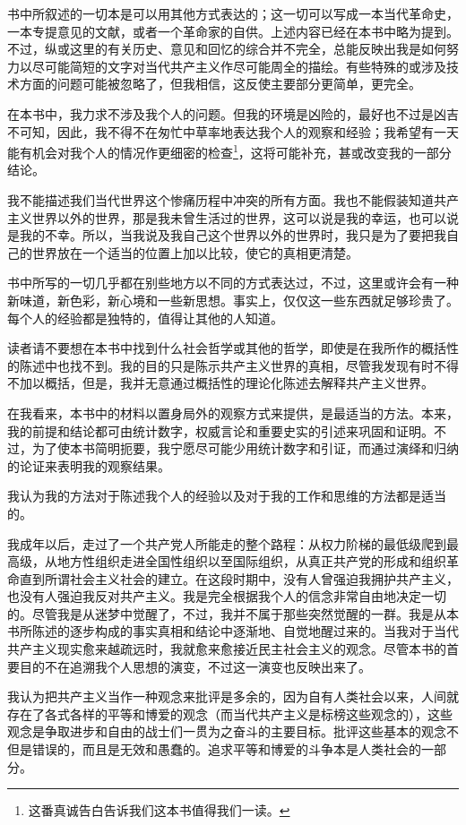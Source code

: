 \documentclass[12pt,oneside]{book}
\begin{document}
\begin{common-format}
书中所叙述的一切本是可以用其他方式表达的；这一切可以写成一本当代革命史，一本专提意见的文献，或者一个革命家的自供。上述内容已经在本书中略为提到。不过，纵或这里的有关历史、意见和回忆的综合并不完全，总能反映出我是如何努力以尽可能简短的文字对当代共产主义作尽可能周全的描绘。有些特殊的或涉及技术方面的问题可能被忽略了，但我相信，这反使主要部分更简单，更完全。
    
在本书中，我力求不涉及我个人的问题。但我的环境是凶险的，最好也不过是凶吉不可知，因此，我不得不在匆忙中草率地表达我个人的观察和经验；我希望有一天能有机会对我个人的情况作更细密的检查\footnote{这番真诚告白告诉我们这本书值得我们一读。}，这将可能补充，甚或改变我的一部分结论。

我不能描述我们当代世界这个惨痛历程中冲突的所有方面。我也不能假装知道共产主义世界以外的世界，那是我未曾生活过的世界，这可以说是我的幸运，也可以说是我的不幸。所以，当我说及我自己这个世界以外的世界时，我只是为了要把我自己的世界放在一个适当的位置上加以比较，使它的真相更清楚。

书中所写的一切几乎都在别些地方以不同的方式表达过，不过，这里或许会有一种新味道，新色彩，新心境和一些新思想。事实上，仅仅这一些东西就足够珍贵了。每个人的经验都是独特的，值得让其他的人知道。

读者请不要想在本书中找到什么社会哲学或其他的哲学，即使是在我所作的概括性的陈述中也找不到。我的目的只是陈示共产主义世界的真相，尽管我发现有时不得不加以概括，但是，我并无意通过概括性的理论化陈述去解释共产主义世界。

在我看来，本书中的材料以置身局外的观察方式来提供，是最适当的方法。本来，我的前提和结论都可由统计数字，权威言论和重要史实的引述来巩固和证明。不过，为了使本书简明扼要，我宁愿尽可能少用统计数字和引证，而通过演绎和归纳的论证来表明我的观察结果。

我认为我的方法对于陈述我个人的经验以及对于我的工作和思维的方法都是适当的。

我成年以后，走过了一个共产党人所能走的整个路程：从权力阶梯的最低级爬到最高级，从地方性组织走进全国性组织以至国际组织，从真正共产党的形成和组织革命直到所谓社会主义社会的建立。在这段时期中，没有人曾强迫我拥护共产主义，也没有人强迫我反对共产主义。我是完全根据我个人的信念非常自由地决定一切的。尽管我是从迷梦中觉醒了，不过，我并不属于那些突然觉醒的一群。我是从本书所陈述的逐步构成的事实真相和结论中逐渐地、自觉地醒过来的。当我对于当代共产主义现实愈来越疏远时，我就愈来愈接近民主社会主义的观念。尽管本书的首要目的不在追溯我个人思想的演变，不过这一演变也反映出来了。

我认为把共产主义当作一种观念来批评是多余的，因为自有人类社会以来，人间就存在了各式各样的平等和博爱的观念（而当代共产主义是标榜这些观念的），这些观念是争取进步和自由的战士们一贯为之奋斗的主要目标。批评这些基本的观念不但是错误的，而且是无效和愚蠢的。追求平等和博爱的斗争本是人类社会的一部分。


\end{common-format}
\end{document}
